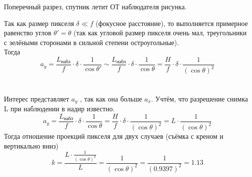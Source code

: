 \begin{enumerate}
    \begin{center}
        Поперечный разрез, спутник летит ОТ наблюдателя рисунка. \\
    \end{center}
    Так как размер пикселя $\delta\ll f$ (фокусное расстояние), то выполняется примерное равенство углов $\theta'=\theta$ (так как угловой размер пикселя очень мал, треугольники с зелёными сторонами в сильной степени остроугольные). \\
    Тогда $$a_y=\frac{L_\text{набл}}{f}\cdot\delta\cdot\frac{1}{\cos\theta'}\sim \frac{L_\text{набл}}{f}\cdot\delta\cdot\frac{1}{\cos\theta} =\frac{H}{f}\cdot\delta\cdot\frac{1}{(\cos\theta)^2}$$\\\\
    Интерес представляет $a_y$ , так как она больше $a_x$. Учтём, что разрешение снимка L при наблюдении в надир известно.
    $$a_y=\frac{L_\text{набл}}{f}\cdot\delta\cdot\frac{1}{\cos\theta}=\frac{H}{f}\cdot\delta\cdot\frac{1}{(\cos\theta)^2} =L\cdot\frac{1}{(\cos\theta)^2}$$ 
    Тогда отношение проекций пикселя для двух случаев (съёмка с креном и вертикально вниз)
    $$k=\frac{L\cdot\frac{1}{(\cos\theta)^2}}{L}=\frac{1}{(\cos\theta)^2}=\frac{1}{(0.9397)^2} =1.13$$
    
\end{enumerate}